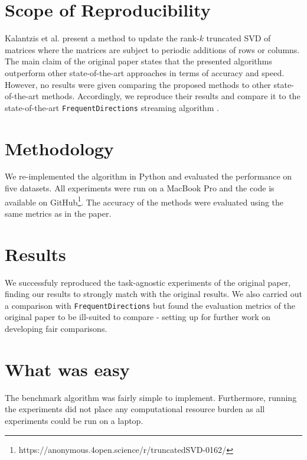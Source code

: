 \label{sec:summary}

\section*{Scope of Reproducibility}

Kalantzis et al. \cite{Kalantzis2021} present a method to update the rank-$k$ truncated SVD of matrices where the matrices are subject to periodic additions of rows or columns.
The main claim of the original paper states that the presented algorithms outperform other state-of-the-art approaches in terms of accuracy and speed.
However, no results were given comparing the proposed methods to other state-of-the-art methods.
Accordingly, we reproduce their results and compare it to the state-of-the-art \verb|FrequentDirections| streaming algorithm \cite{Ghashami2016}.

\section*{Methodology}

We re-implemented the algorithm in Python and evaluated the performance on five datasets.
All experiments were run on a MacBook Pro and the code is available on GitHub\footnote{https://anonymous.4open.science/r/truncatedSVD-0162/}.
The accuracy of the methods were evaluated using the same metrics as in the paper.

\section*{Results}

We successfuly reproduced the task-agnostic experiments of the original paper, finding our results to strongly match with the original results.
We also carried out a comparison with \verb|FrequentDirections| but found the evaluation metrics of the original paper to be ill-suited to compare - setting up for further work on developing fair comparisons. 

\section*{What was easy}

The benchmark algorithm was fairly simple to implement.
Furthermore, running the experiments did not place any computational resource burden as all experiments could be run on a laptop.


